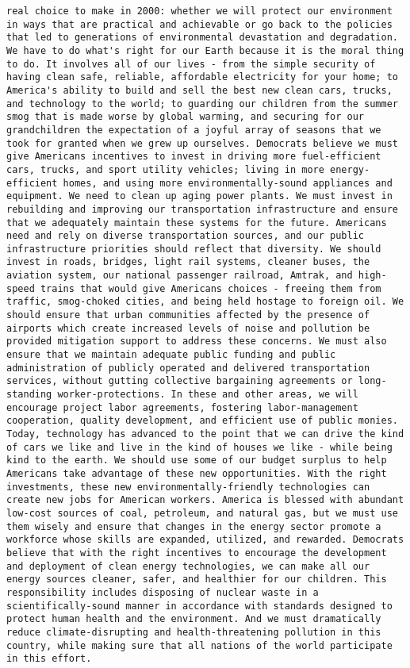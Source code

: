 \documentclass[
]{article}
\begin{document}
\begin{verbatim}
real choice to make in 2000: whether we will protect our environment in ways that are practical and achievable or go back to the policies that led to generations of environmental devastation and degradation. We have to do what's right for our Earth because it is the moral thing to do. It involves all of our lives - from the simple security of having clean safe, reliable, affordable electricity for your home; to America's ability to build and sell the best new clean cars, trucks, and technology to the world; to guarding our children from the summer smog that is made worse by global warming, and securing for our grandchildren the expectation of a joyful array of seasons that we took for granted when we grew up ourselves. Democrats believe we must give Americans incentives to invest in driving more fuel-efficient cars, trucks, and sport utility vehicles; living in more energy-efficient homes, and using more environmentally-sound appliances and equipment. We need to clean up aging power plants. We must invest in rebuilding and improving our transportation infrastructure and ensure that we adequately maintain these systems for the future. Americans need and rely on diverse transportation sources, and our public infrastructure priorities should reflect that diversity. We should invest in roads, bridges, light rail systems, cleaner buses, the aviation system, our national passenger railroad, Amtrak, and high-speed trains that would give Americans choices - freeing them from traffic, smog-choked cities, and being held hostage to foreign oil. We should ensure that urban communities affected by the presence of airports which create increased levels of noise and pollution be provided mitigation support to address these concerns. We must also ensure that we maintain adequate public funding and public administration of publicly operated and delivered transportation services, without gutting collective bargaining agreements or long-standing worker-protections. In these and other areas, we will encourage project labor agreements, fostering labor-management cooperation, quality development, and efficient use of public monies. Today, technology has advanced to the point that we can drive the kind of cars we like and live in the kind of houses we like - while being kind to the earth. We should use some of our budget surplus to help Americans take advantage of these new opportunities. With the right investments, these new environmentally-friendly technologies can create new jobs for American workers. America is blessed with abundant low-cost sources of coal, petroleum, and natural gas, but we must use them wisely and ensure that changes in the energy sector promote a workforce whose skills are expanded, utilized, and rewarded. Democrats believe that with the right incentives to encourage the development and deployment of clean energy technologies, we can make all our energy sources cleaner, safer, and healthier for our children. This responsibility includes disposing of nuclear waste in a scientifically-sound manner in accordance with standards designed to protect human health and the environment. And we must dramatically reduce climate-disrupting and health-threatening pollution in this country, while making sure that all nations of the world participate in this effort. 
\end{verbatim}
\end{document}
